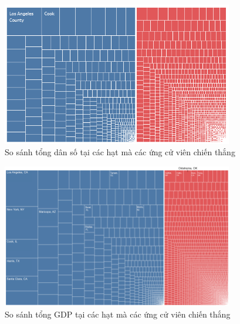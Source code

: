 \documentclass[10pt]{beamer}
\theoremstyle{remark}
\theoremstyle{definition}
\begin{document}
\begin{frame}
    \begin{figure}[h!]
        \centering
        \includegraphics[width=0.9\textwidth]{figures/County_Population_Treemap.png}
        \caption{So sánh tổng dân số tại các hạt mà các ứng cử viên chiến thắng}
    \end{figure}
\end{frame}

\begin{frame}
    \begin{figure}[h!]
        \centering
        \includegraphics[width=0.9\textwidth]{figures/County_GDP_Treemap.png}
        \caption{So sánh tổng GDP tại các hạt mà các ứng cử viên chiến thắng}
    \end{figure}
\end{frame}
\end{document}
